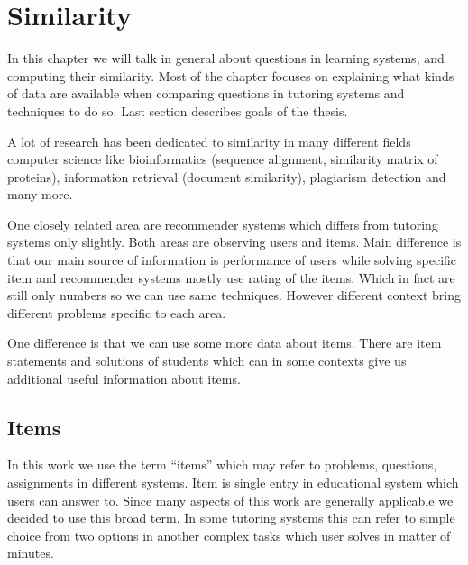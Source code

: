 \documentclass[
  digital, %
  table,   %
  nolof,     %
  nolot,     %
  nocover
]{fithesis3}
\begin{document}
\chapter{Similarity}




In this chapter we will talk in general about questions in learning
systems, and computing their similarity. Most of the chapter focuses on
explaining what kinds of data are available when comparing questions in
tutoring systems and techniques to do so. Last section describes goals
of the thesis.


A lot of research has been dedicated to similarity in many different
fields computer science like bioinformatics (sequence alignment,
similarity matrix of proteins), information retrieval (document
similarity), plagiarism detection and many more.


One closely related area are recommender systems which differs from tutoring systems only slightly. Both areas are observing users and items. Main difference is that our main source of information is performance of users while solving specific item and recommender systems mostly use rating of the items. Which in fact are still only numbers so we can use same techniques. However different context bring different problems specific to each area.


One difference is that we can use some more data about items. There are item statements and solutions of students which can in some contexts give us additional useful information about items.

\section{Items}\label{items}



In this work we use the term ``items'' which may refer to problems, questions,
assignments in different systems. Item is single entry in educational system which
users can answer to. Since many aspects of this work are generally
applicable we decided to use this broad term. In some tutoring systems
this can refer to simple choice from two options in another complex
tasks which user solves in matter of minutes.
\end{document}
